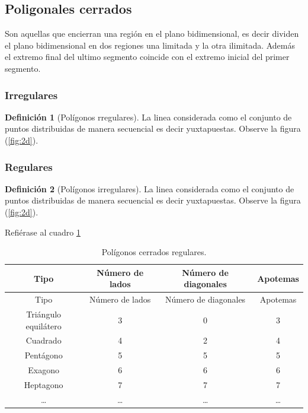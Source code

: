 \documentclass[
  16pt,
]{krantz}
\theoremstyle{definition}
\newtheorem{definition}{Definición}[chapter]
\theoremstyle{definition}
\theoremstyle{definition}
\theoremstyle{definition}
\theoremstyle{remark}
\begin{document}
\hypertarget{poligonales-cerrados}{%
\subsection{Poligonales cerrados}\label{poligonales-cerrados}}

Son aquellas que encierran una región en el plano bidimensional, es decir dividen el plano bidimensional en dos regiones una limitada y la otra ilimitada. Además el extremo final del ultimo segmento coincide con el extremo inicial del primer segmento.

\hypertarget{irregulares}{%
\subsubsection{Irregulares}\label{irregulares}}

\begin{definition}[Polígonos rregulares]
\protect\hypertarget{def:irregulares}{}{\label{def:irregulares} {} }La linea considerada como el conjunto de puntos distribuidas de manera secuencial es decir yuxtapuestas. Observe la figura (\ref{fig:2d}).
\end{definition}

\hypertarget{regulares}{%
\subsubsection{Regulares}\label{regulares}}

\begin{definition}[Polígonos irregulares]
\protect\hypertarget{def:regulares}{}{\label{def:regulares} {} }La linea considerada como el conjunto de puntos distribuidas de manera secuencial es decir yuxtapuestas. Observe la figura (\ref{fig:2d}).
\end{definition}

Refiérase al cuadro \ref{tab:regulares}

\begin{longtable}[]{@{}cccc@{}}
\caption{\label{tab:regulares} Polígonos cerrados regulares.}\tabularnewline
\toprule
Tipo & Número de lados & Número de diagonales & Apotemas \\
\midrule
\endfirsthead
\toprule
Tipo & Número de lados & Número de diagonales & Apotemas \\
\midrule
\endhead
Triángulo equilátero & 3 & 0 & 3 \\
Cuadrado & 4 & 2 & 4 \\
Pentágono & 5 & 5 & 5 \\
Exagono & 6 & 6 & 6 \\
Heptagono & 7 & 7 & 7 \\
\ldots{} & \ldots{} & \ldots{} & \ldots{} \\
\bottomrule
\end{longtable}
\end{document}
